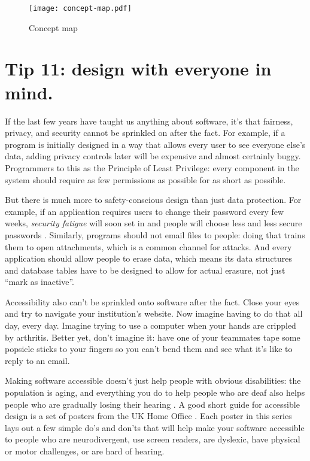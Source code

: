 \documentclass[10pt,letterpaper]{article}
\begin{document}
\begin{figure}
  \centering
  \texttt{[image: concept-map.pdf]}
  \caption{Concept map}
  \label{concept-map}
\end{figure}

\section*{Tip 11: design with everyone in mind.}

If the last few years have taught us anything about software,
it's that fairness, privacy, and security cannot be sprinkled on after the fact.
For example,
if a program is initially designed in a way that allows every user to see everyone else's data,
adding privacy controls later will be expensive and almost certainly buggy.
Programmers to this as the Principle of Least Privilege:
every component in the system should require as few permissions as possible
for as short as possible.

But there is much more to safety-conscious design than just data protection.
For example,
if an application requires users to change their password every few weeks,
\emph{security fatigue} will soon set in
and people will choose less and less secure passwords \cite{Smalls2021}.
Similarly,
programs should not email files to people:
doing that trains them to open attachments,
which is a common channel for attacks.
And every application should allow people to erase data,
which means its data structures and database tables have to be designed to allow for actual erasure,
not just ``mark as inactive''.

Accessibility also can't be sprinkled onto software after the fact.
Close your eyes and try to navigate your institution's website.
Now imagine having to do that all day, every day.
Imagine trying to use a computer when your hands are crippled by arthritis.
Better yet, don't imagine it:
have one of your teammates tape some popsicle sticks to your fingers so you can't bend them
and see what it's like to reply to an email.

Making software accessible doesn't just help people with obvious disabilities:
the population is aging,
and everything you do to help people who are deaf also helps people
who are gradually losing their hearing \cite{Johnson2017}.
A good short guide for accessible design is a set of posters from the UK Home Office \cite{UKHO}.
Each poster in this series lays out a few simple do's and don'ts that will help make your software accessible
to people who are neurodivergent,
use screen readers,
are dyslexic,
have physical or motor challenges, or are hard of hearing.
\end{document}
